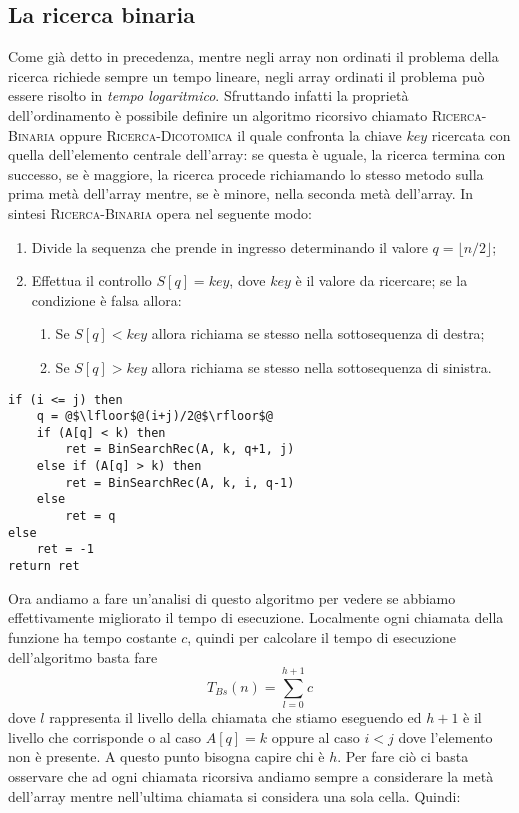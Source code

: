 \subsection{La ricerca binaria}
Come già detto in precedenza, mentre negli array non ordinati il problema della ricerca richiede sempre un tempo lineare, negli array ordinati il problema può essere risolto in \textit{tempo logaritmico}. Sfruttando infatti la proprietà dell'ordinamento è possibile definire un algoritmo ricorsivo chiamato \textsc{Ricerca-Binaria} oppure \textsc{Ricerca-Dicotomica} il quale confronta la chiave $key$ ricercata con quella dell'elemento centrale dell'array: se questa è uguale, la ricerca termina con successo, se è maggiore, la ricerca procede richiamando lo stesso metodo sulla prima metà dell'array mentre, se è minore, nella seconda metà dell'array. In sintesi \textsc{Ricerca-Binaria} opera nel seguente modo:
\begin{enumerate}
	\item Divide la sequenza che prende in ingresso determinando il valore $q= \lfloor n/2 \rfloor$;
	\item Effettua il controllo $S[q]=key$, dove $key$ è il valore da ricercare; se la condizione è falsa allora:
	\begin{enumerate}
		\item Se $S[q]<key$ allora richiama se stesso nella sottosequenza di destra;
		\item Se $S[q]>key$ allora richiama se stesso nella sottosequenza di sinistra.
	\end{enumerate}
\end{enumerate}

\begin{lstlisting}[label = lst:BinSearchRec, language=asd, caption={BinSearchRec(A,k,i,j)}]
if (i <= j) then
    q = @$\lfloor$@(i+j)/2@$\rfloor$@
    if (A[q] < k) then
        ret = BinSearchRec(A, k, q+1, j)
    else if (A[q] > k) then
        ret = BinSearchRec(A, k, i, q-1)
    else
        ret = q
else
    ret = -1
return ret
\end{lstlisting}

Ora andiamo a fare un'analisi di questo algoritmo per vedere se abbiamo effettivamente migliorato il tempo di esecuzione. Localmente ogni chiamata della funzione ha tempo costante $c$, quindi per calcolare il tempo di esecuzione dell'algoritmo basta fare \[T_{Bs}(n) = \sum_{l=0}^{h+1} c\] dove $l$ rappresenta il livello della chiamata che stiamo eseguendo ed $h+1$ è il livello che corrisponde o al caso $A[q] = k$ oppure al caso $i<j$ dove l'elemento non è presente. A questo punto bisogna capire chi è $h$. Per fare ciò ci basta osservare che ad ogni chiamata ricorsiva andiamo sempre a considerare la metà dell'array mentre nell'ultima chiamata si considera una sola cella. Quindi:


